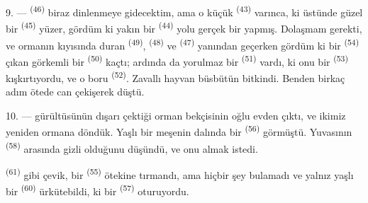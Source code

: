 9. ---  \textsuperscript{(46)} biraz
dinlenmeye gidecektim, ama o küçük  \textsuperscript{(43)} varınca, ki üstünde güzel
bir  \textsuperscript{(45)} yüzer, gördüm ki yakın bir  \textsuperscript{(44)} yolu gerçek
bir  yapmış. Dolaşmam gerekti, ve ormanın kıyısında duran
 \textsuperscript{(49)}, 
\textsuperscript{(48)} ve  \textsuperscript{(47)}
yanından geçerken gördüm ki bir  \textsuperscript{(54)}
çıkan görkemli bir  \textsuperscript{(50)} kaçtı; ardında da
yorulmaz bir  \textsuperscript{(51)} vardı, ki onu bir  \textsuperscript{(53)} kışkırtıyordu, ve o
boru  \textsuperscript{(52)}. Zavallı hayvan büsbütün bitkindi. Benden
birkaç adım ötede can çekişerek düştü.

10. ---  gürültüsünün dışarı çektiği orman bekçisinin oğlu evden
çıktı, ve ikimiz yeniden ormana döndük. Yaşlı bir meşenin dalında bir
 \textsuperscript{(56)} görmüştü. Yuvasının
 \textsuperscript{(58)} arasında gizli olduğunu düşündü, ve
onu almak istedi.

 \textsuperscript{(61)} gibi çevik, bir 
\textsuperscript{(55)} ötekine tırmandı, ama hiçbir şey bulamadı ve yalnız yaşlı bir 
\textsuperscript{(60)} ürkütebildi, ki bir 
\textsuperscript{(57)} oturuyordu.
\VUsaut{4.0mm}
\VUfilet{22mm}
